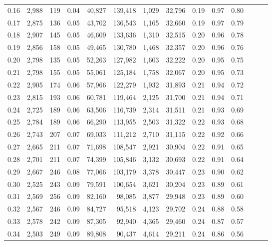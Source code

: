\begin{tabular}{rrrrrrrrrrrrrr}
0.16 &  2,988 &  119 &  0.04 &   40,827 &  139,418 &   1,029 &  32,796 &  0.19 &  0.97 &      0.80 \\
0.17 &  2,875 &  136 &  0.05 &   43,702 &  136,543 &   1,165 &  32,660 &  0.19 &  0.97 &      0.79 \\
0.18 &  2,907 &  145 &  0.05 &   46,609 &  133,636 &   1,310 &  32,515 &  0.20 &  0.96 &      0.78 \\
0.19 &  2,856 &  158 &  0.05 &   49,465 &  130,780 &   1,468 &  32,357 &  0.20 &  0.96 &      0.76 \\
0.20 &  2,798 &  135 &  0.05 &   52,263 &  127,982 &   1,603 &  32,222 &  0.20 &  0.95 &      0.75 \\
0.21 &  2,798 &  155 &  0.05 &   55,061 &  125,184 &   1,758 &  32,067 &  0.20 &  0.95 &      0.73 \\
0.22 &  2,905 &  174 &  0.06 &   57,966 &  122,279 &   1,932 &  31,893 &  0.21 &  0.94 &      0.72 \\
0.23 &  2,815 &  193 &  0.06 &   60,781 &  119,464 &   2,125 &  31,700 &  0.21 &  0.94 &      0.71 \\
0.24 &  2,725 &  189 &  0.06 &   63,506 &  116,739 &   2,314 &  31,511 &  0.21 &  0.93 &      0.69 \\
0.25 &  2,784 &  189 &  0.06 &   66,290 &  113,955 &   2,503 &  31,322 &  0.22 &  0.93 &      0.68 \\
0.26 &  2,743 &  207 &  0.07 &   69,033 &  111,212 &   2,710 &  31,115 &  0.22 &  0.92 &      0.66 \\
0.27 &  2,665 &  211 &  0.07 &   71,698 &  108,547 &   2,921 &  30,904 &  0.22 &  0.91 &      0.65 \\
0.28 &  2,701 &  211 &  0.07 &   74,399 &  105,846 &   3,132 &  30,693 &  0.22 &  0.91 &      0.64 \\
0.29 &  2,667 &  246 &  0.08 &   77,066 &  103,179 &   3,378 &  30,447 &  0.23 &  0.90 &      0.62 \\
0.30 &  2,525 &  243 &  0.09 &   79,591 &  100,654 &   3,621 &  30,204 &  0.23 &  0.89 &      0.61 \\
0.31 &  2,569 &  256 &  0.09 &   82,160 &   98,085 &   3,877 &  29,948 &  0.23 &  0.89 &      0.60 \\
0.32 &  2,567 &  246 &  0.09 &   84,727 &   95,518 &   4,123 &  29,702 &  0.24 &  0.88 &      0.58 \\
0.33 &  2,578 &  242 &  0.09 &   87,305 &   92,940 &   4,365 &  29,460 &  0.24 &  0.87 &      0.57 \\
0.34 &  2,503 &  249 &  0.09 &   89,808 &   90,437 &   4,614 &  29,211 &  0.24 &  0.86 &      0.56 \\

\end{tabular}
